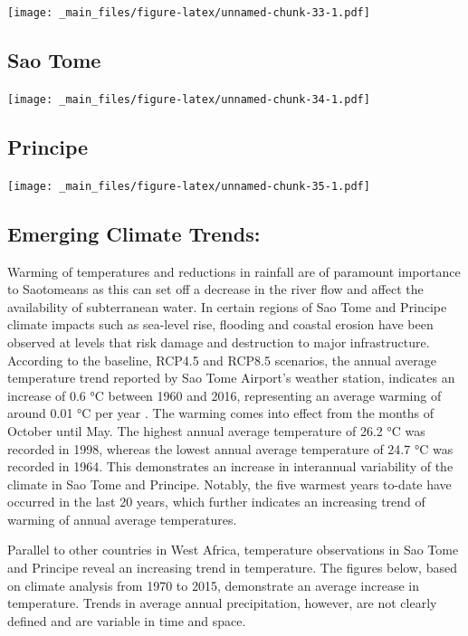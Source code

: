 \documentclass[
]{book}
\begin{document}
\texttt{[image: \_main\_files/figure-latex/unnamed-chunk-33-1.pdf]}

\hypertarget{sao-tome-1}{%
\subsection{Sao Tome}\label{sao-tome-1}}

\texttt{[image: \_main\_files/figure-latex/unnamed-chunk-34-1.pdf]}

\hypertarget{principe-1}{%
\subsection{Principe}\label{principe-1}}

\texttt{[image: \_main\_files/figure-latex/unnamed-chunk-35-1.pdf]}

\hypertarget{emerging-climate-trends-1}{%
\subsection{Emerging Climate Trends:}\label{emerging-climate-trends-1}}

Warming of temperatures and reductions in rainfall are of paramount importance to Saotomeans as this can set off a decrease in the river flow and affect the availability of subterranean water. In certain regions of Sao Tome and Principe climate impacts such as sea-level rise, flooding and coastal erosion have been observed at levels that risk damage and destruction to major infrastructure. According to the baseline, RCP4.5 and RCP8.5 scenarios, the annual average temperature trend reported by Sao Tome Airport's weather station, indicates an increase of 0.6 °C between 1960 and 2016, representing an average warming of around 0.01 °C per year . The warming comes into effect from the months of October until May. The highest annual average temperature of 26.2 °C was recorded in 1998, whereas the lowest annual average temperature of 24.7 °C was recorded in 1964. This demonstrates an increase in interannual variability of the climate in Sao Tome and Principe. Notably, the five warmest years to-date have occurred in the last 20 years, which further indicates an increasing trend of warming of annual average temperatures.

Parallel to other countries in West Africa, temperature observations in Sao Tome and Principe reveal an increasing trend in temperature. The figures below, based on climate analysis from 1970 to 2015, demonstrate an average increase in temperature. Trends in average annual precipitation, however, are not clearly defined and are variable in time and space.
\end{document}
